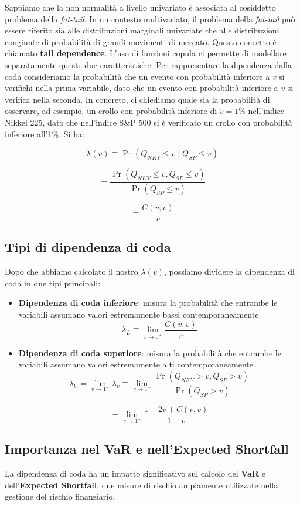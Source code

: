 \documentclass[%
	corpo=11pt,
    twoside,
    stile=classica,
    oldstyle,
    tipotesi=custom,
    greek,
    evenboxes,
]{toptesi}
\begin{document}
Sappiamo che la non normalità a livello univariato è associata al cosiddetto problema della \textit{fat-tail}. In un contesto multivariato, il problema della \textit{fat-tail} può essere riferito sia alle distribuzioni marginali univariate che alle distribuzioni congiunte di probabilità di grandi movimenti di mercato. Questo concetto è chiamato \textbf{tail dependence}. L’uso di funzioni copula ci permette di modellare separatamente queste due caratteristiche. Per rappresentare la dipendenza dalla coda consideriamo la probabilità che un evento con probabilità inferiore a \( v \) si verifichi nella prima variabile, dato che un evento con probabilità inferiore a \( v \) si verifica nella seconda. In concreto, ci chiediamo quale sia la probabilità di osservare, ad esempio, un crollo con probabilità inferiore di \( v=1\% \) nell’indice Nikkei 225, dato che nell’indice S\&P 500 si è verificato un crollo con probabilità inferiore all’1\%. Si ha:

\[
\lambda(v) \equiv \Pr(Q_{NKY} \leq v \mid Q_{SP} \leq v)
\]

\[
= \frac{\Pr(Q_{NKY} \leq v, Q_{SP} \leq v)}{\Pr(Q_{SP} \leq v)}
\]

\[
= \frac{C(v,v)}{v}
\]

\subsection{Tipi di dipendenza di coda}
Dopo che abbiamo calcolato il nostro \( \lambda(v) \), possiamo dividere la dipendenza di coda in due tipi principali:

\begin{itemize}
	\item \textbf{Dipendenza di coda inferiore}: misura la probabilità che entrambe le variabili assumano valori estremamente bassi contemporaneamente.
	\[
	\lambda_L \equiv \lim_{v \to 0^+} \frac{C(v,v)}{v}
	\]
	
	\item \textbf{Dipendenza di coda superiore}: misura la probabilità che entrambe le variabili assumano valori estremamente alti contemporaneamente.
	\[
	\lambda_U = \lim_{v \to 1^-} \lambda_v \equiv \lim_{v \to 1^-} \frac{\Pr(Q_{NKY} > v, Q_{SP} > v)}{\Pr(Q_{SP} > v)}
	\]
	
	\[
	= \lim_{v \to 1^-} \frac{1 - 2v + C(v,v)}{1 - v}
	\]
\end{itemize}

\subsection{Importanza nel VaR e nell’Expected Shortfall}
La dipendenza di coda ha un impatto significativo sul calcolo del \textbf{VaR} e dell’\textbf{Expected Shortfall}, due misure di rischio ampiamente utilizzate nella gestione del rischio finanziario.
\end{document}
